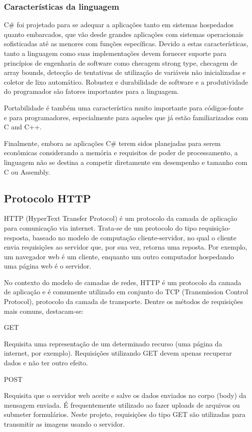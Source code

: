 	\subsubsection{Características da linguagem}\label{subsubsec-caractcsharp}

	C\# foi projetado para se adequar a aplicações tanto em sistemas hospedados quanto embarcados, que vão desde grandes aplicações com sistemas operacionais sofisticadas até as menores com funções específicas. 
	Devido a estas características, tanto a linguagem como suas implementações devem fornecer suporte para princípios de engenharia de software como checagem strong type, checagem de array bounds, detecção de tentativas de utilização de variáveis não inicializadas e coletor de lixo automático. Robustez e durabilidade de software e a produtividade do programador são fatores importantes para a linguagem.

	Portabilidade é também uma característica muito importante para códigos-fonte e para programadores, especialmente para aqueles que já estão familiarizados com C and C++. 
		
	Finalmente, embora as aplicações C\# terem sidos planejadas para serem econômicas considerando a memória e requisitos de poder de processamento, a linguagem não se destina a competir diretamente em desempenho e tamanho com C ou Assembly.	
	  
	 
	\subsection{Protocolo HTTP}\label{subsec-http}
	
	HTTP (HyperText Transfer Protocol) é um protocolo da camada de aplicação para comunicação via internet. Trata-se de um protocolo do tipo requisição-resposta, baseado no modelo de computação cliente-servidor, no qual o cliente envia requisições ao servidor que, por sua vez, retorna uma reposta. Por exemplo, um navegador web é um cliente, enquanto um outro computador hospedando uma página web é o servidor.\par
	No contexto do modelo de camadas de redes, HTTP é um protocolo da camada de aplicação e é comumente utilizado em conjunto do TCP (Transmission Control Protocol), protocolo da camada de transporte.
	Dentre os métodos de requisições mais comuns, destacam-se:\par
	GET\par
	Requisita uma representação de um determinado recurso (uma página da internet, por exemplo). Requisições utilizando GET devem apenas recuperar dados e não ter outro efeito.\par
	POST\par
	Requisita que o servidor web aceite e salve os dados enviados no corpo (body) da mensagem enviada. É frequentemente utilizado ao fazer uploads de arquivos ou submeter formulários. Neste projeto, requisições do tipo GET são utilizadas para transmitir as imagens usando o servidor.\par

